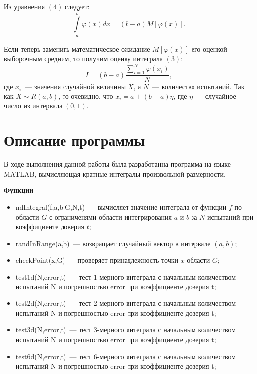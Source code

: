 \documentclass[a4paper,12pt]{article}
\begin{document}
Из уравнения $(4)$ следует:
\begin{equation}
	\int\limits_a^b \varphi(x)dx = (b-a)M[\varphi(x)].
\end{equation}

Если теперь заменить математическое ожидание $M[\varphi(x)]$ его оценкой~--- выборочным средним, то получим оценку интеграла $(3)$:
\begin{equation}
	I = (b-a)\frac{{\displaystyle \sum_{i=1}^N \varphi(x_i)}}{N},
\end{equation}
где $x_i$~--- значения случайной величины $X$, а $N$~--- количество испытаний. Так как $X \sim R(a,b)$, то очевидно, что $x_i = a+(b-a)\eta$, где $\eta$~--- случайное число из интервала $(0,1)$.



\newpage
\section{Описание программы}

В ходе выполнения данной работы была разработанна программа на языке {\ttfamily MATLAB}, вычисляющая кратные интегралы произвольной размерности.

{\textbf{Функции}}
\begin{itemize}
	\item {\ttfamily ndIntegral(f,a,b,G,N,t)}~--- вычисляет значение интеграла от функции $f$ по области $G$ с ограниченями области интегрирования $a$ и $b$ за $N$ испытаний при коэффициенте доверия $t$;
	\item {\ttfamily randInRange(a,b)}~--- возвращает случайный вектор в интервале $(a,b)$;
	\item {\ttfamily checkPoint(x,G)}~--- проверяет принадлежность точки $x$ области $G$;
	\item {\ttfamily test1d(N,error,t)}~--- тест 1-мерного интеграла с начальным количеством испытаний {\ttfamily N} и погрешностью {\ttfamily error} при коэффициенте доверия {\ttfamily t};
	\item {\ttfamily test2d(N,error,t)}~--- тест 2-мерного интеграла с начальным количеством испытаний {\ttfamily N} и погрешностью {\ttfamily error} при коэффициенте доверия {\ttfamily t};
	\item {\ttfamily test3d(N,error,t)}~--- тест 3-мерного интеграла с начальным количеством испытаний {\ttfamily N} и погрешностью {\ttfamily error} при коэффициенте доверия {\ttfamily t};
	\item {\ttfamily test6d(N,error,t)}~--- тест 6-мерного интеграла с начальным количеством испытаний {\ttfamily N} и погрешностью {\ttfamily error} при коэффициенте доверия {\ttfamily t};
\end{itemize}
\end{document}

